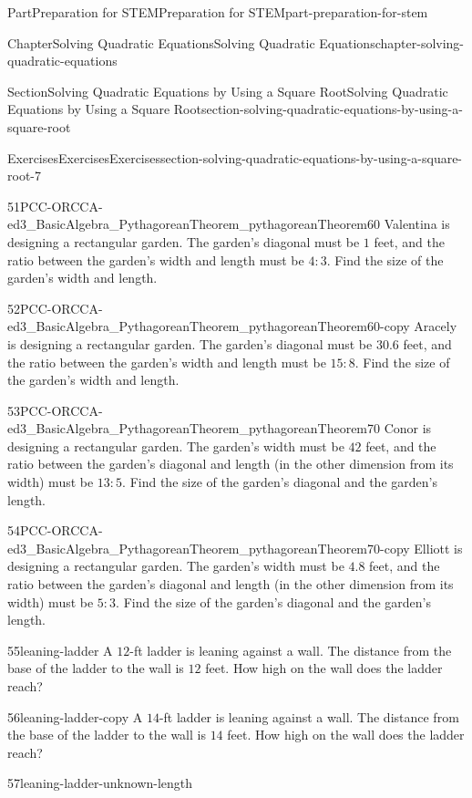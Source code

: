 \documentclass[twoside,10pt,]{book}
\numberwithin{equation}{section}
\begin{document}
\begin{partptx}{Part}{Preparation for STEM}{}{Preparation for STEM}{}{}{part-preparation-for-stem}
\begin{chapterptx}{Chapter}{Solving Quadratic Equations}{}{Solving Quadratic Equations}{}{}{chapter-solving-quadratic-equations}
\begin{sectionptx}{Section}{Solving Quadratic Equations by Using a Square Root}{}{Solving Quadratic Equations by Using a Square Root}{}{}{section-solving-quadratic-equations-by-using-a-square-root}
\begin{exercises-subsection}{Exercises}{Exercises}{}{Exercises}{}{}{section-solving-quadratic-equations-by-using-a-square-root-7}
\begin{exercisegroup}
\begin{divisionexerciseeg}{51}{}{}{PCC-ORCCA-ed3_BasicAlgebra_PythagoreanTheorem_pythagoreanTheorem60}
Valentina is designing a rectangular garden. The garden's diagonal must be \(1\) feet, and the ratio between the garden's width and length must be \(4:3\). Find the size of the garden's width and length.%
\end{divisionexerciseeg}%
\begin{divisionexerciseeg}{52}{}{}{PCC-ORCCA-ed3_BasicAlgebra_PythagoreanTheorem_pythagoreanTheorem60-copy}%
Aracely is designing a rectangular garden. The garden's diagonal must be \(30.6\) feet, and the ratio between the garden's width and length must be \(15:8\). Find the size of the garden's width and length.%
\end{divisionexerciseeg}%
\begin{divisionexerciseeg}{53}{}{}{PCC-ORCCA-ed3_BasicAlgebra_PythagoreanTheorem_pythagoreanTheorem70}%
Conor is designing a rectangular garden. The garden's width must be \(42\) feet, and the ratio between the garden's diagonal and length (in the other dimension from its width) must be \(13:5\). Find the size of the garden's diagonal and the garden's length.%
\end{divisionexerciseeg}%
\begin{divisionexerciseeg}{54}{}{}{PCC-ORCCA-ed3_BasicAlgebra_PythagoreanTheorem_pythagoreanTheorem70-copy}%
Elliott is designing a rectangular garden. The garden's width must be \(4.8\) feet, and the ratio between the garden's diagonal and length (in the other dimension from its width) must be \(5:3\). Find the size of the garden's diagonal and the garden's length.%
\end{divisionexerciseeg}%
\begin{divisionexerciseeg}{55}{}{}{leaning-ladder}%
A \(12\)-ft ladder is leaning against a wall. The distance from the base of the ladder to the wall is \(12\) feet. How high on the wall does the ladder reach?%
\end{divisionexerciseeg}%
\begin{divisionexerciseeg}{56}{}{}{leaning-ladder-copy}%
A \(14\)-ft ladder is leaning against a wall. The distance from the base of the ladder to the wall is \(14\) feet. How high on the wall does the ladder reach?%
\end{divisionexerciseeg}%
\begin{divisionexerciseeg}{57}{}{}{leaning-ladder-unknown-length}%

\end{divisionexerciseeg}
\end{exercisegroup}
\end{exercises-subsection}
\end{sectionptx}
\end{chapterptx}
\end{partptx}
\end{document}
